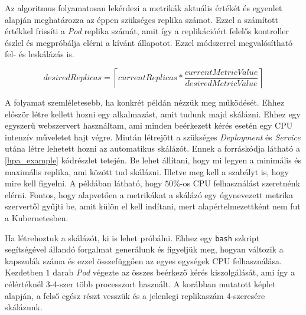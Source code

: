Az algoritmus folyamatosan lekérdezi a metrikák aktuális értékét és  egyenlet alapján meghatározza az éppen szükséges replika számot. Ezzel a számított értékkel frissíti a \textit{Pod} replika számát, amit így a replikációért felelős kontroller észlel és megpróbálja elérni a kívánt állapotot. Ezzel módszerrel megvalósítható fel- és leskálázás is.

\begin{equation}
\label{hpa_algo}
desiredReplicas = \left\lceil currentReplicas * \frac{currentMetricValue}{desiredMetricValue} \right\rceil
\end{equation}

A folyamat szemléletesebb, ha konkrét példán nézzük meg működését. Ehhez először létre kellett hozni egy alkalmazást, amit tudunk majd skálázni. Ehhez egy egyszerű webszervert használtam, ami minden beérkezett kérés esetén egy CPU intenzív műveletet hajt végre. Miután létrejött a szükséges \textit{Deployment} és \textit{Service} utána létre lehetett hozni az automatikus skálázót. Ennek a forráskódja látható a \ref{hpa_example} kódrészlet tetején. Be lehet állítani, hogy mi legyen a minimális és maximális replika, ami között tud skálázni. Illetve meg kell a szabályt is, hogy mire kell figyelni. A példában látható, hogy $50\%$-os CPU felhasználást szeretnénk elérni. Fontos, hogy alapvetően a metrikákat a skálázó egy úgynevezett metrika szervertől gyűjti be, amit külön el kell indítani, mert alapértelmezettként nem fut a Kubernetesben.

Ha létrehoztuk a skálázót, ki is lehet próbálni. Ehhez egy \verb+bash+ szkript segítségével állandó forgalmat generálunk és figyeljük meg, hogyan változik a kapszulák száma és ezzel összefüggően az egyes egységek CPU felhasználása. Kezdetben $1$ darab \textit{Pod} végezte az összes beérkező kérés kiszolgálását, ami így a célértéknél 3-4-szer több processzort használt. A korábban mutatott képlet alapján, a felső egész részt vesszük és a jelenlegi replikaszám 4-szeresére skálázunk. \\
 
\lstset{caption=Automatikus horizontális skálázás folyamata, label=hpa_example}



